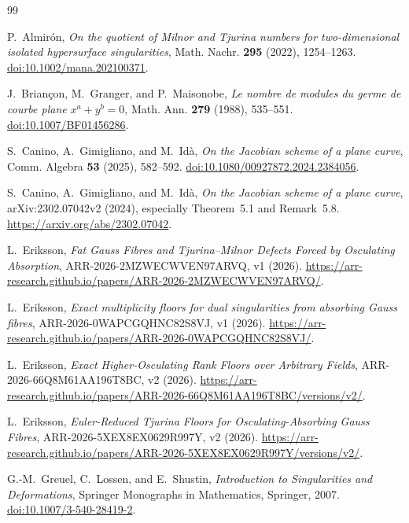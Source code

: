 \documentclass[11pt]{article}
\theoremstyle{remark}
\begin{document}
\begin{thebibliography}{99}

P.~Almir\'on,
\emph{On the quotient of Milnor and Tjurina numbers for two-dimensional
isolated hypersurface singularities},
Math. Nachr. \textbf{295} (2022), 1254--1263.
\href{https://doi.org/10.1002/mana.202100371}
{doi:10.1002/mana.202100371}.

J.~Brian\c{c}on, M.~Granger, and P.~Maisonobe,
\emph{Le nombre de modules du germe de courbe plane \(x^a+y^b=0\)},
Math. Ann. \textbf{279} (1988), 535--551.
\href{https://doi.org/10.1007/BF01456286}{doi:10.1007/BF01456286}.

S.~Canino, A.~Gimigliano, and M.~Id\`a,
\emph{On the Jacobian scheme of a plane curve},
Comm. Algebra \textbf{53} (2025), 582--592.
\href{https://doi.org/10.1080/00927872.2024.2384056}
{doi:10.1080/00927872.2024.2384056}.

S.~Canino, A.~Gimigliano, and M.~Id\`a,
\emph{On the Jacobian scheme of a plane curve}, arXiv:2302.07042v2 (2024),
especially Theorem~5.1 and Remark~5.8.
\url{https://arxiv.org/abs/2302.07042}.

L.~Eriksson,
\emph{Fat Gauss Fibres and Tjurina--Milnor Defects Forced by Osculating
Absorption}, ARR-2026-2MZWECWVEN97ARVQ, v1 (2026).
\url{https://arr-research.github.io/papers/ARR-2026-2MZWECWVEN97ARVQ/}.

L.~Eriksson,
\emph{Exact multiplicity floors for dual singularities from absorbing Gauss
fibres}, ARR-2026-0WAPCGQHNC82S8VJ, v1 (2026).
\url{https://arr-research.github.io/papers/ARR-2026-0WAPCGQHNC82S8VJ/}.

L.~Eriksson,
\emph{Exact Higher-Osculating Rank Floors over Arbitrary Fields},
ARR-2026-66Q8M61AA196T8BC, v2 (2026).
\url{https://arr-research.github.io/papers/ARR-2026-66Q8M61AA196T8BC/versions/v2/}.

L.~Eriksson,
\emph{Euler-Reduced Tjurina Floors for Osculating-Absorbing Gauss Fibres},
ARR-2026-5XEX8EX0629R997Y, v2 (2026).
\url{https://arr-research.github.io/papers/ARR-2026-5XEX8EX0629R997Y/versions/v2/}.

G.-M.~Greuel, C.~Lossen, and E.~Shustin,
\emph{Introduction to Singularities and Deformations},
Springer Monographs in Mathematics, Springer, 2007.
\href{https://doi.org/10.1007/3-540-28419-2}{doi:10.1007/3-540-28419-2}.


\end{thebibliography}
\end{document}
